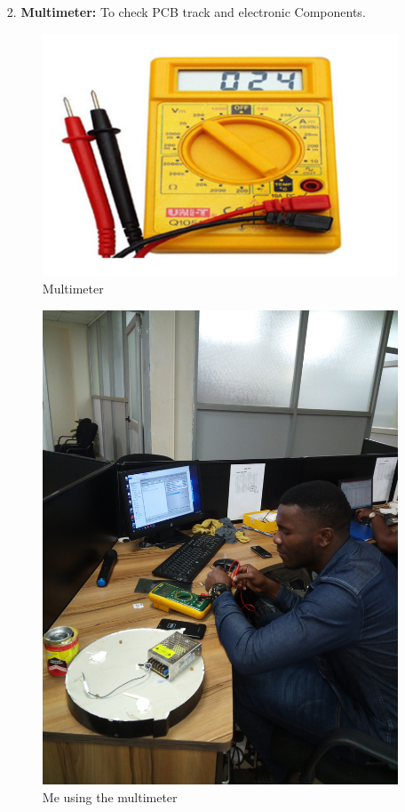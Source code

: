\begin{itemize}
\item[2.] \textbf{Multimeter:} To check PCB track and electronic Components.
\begin{figure}[h!]
\begin{raggedright}
	\includegraphics[scale=0.5]{img/multimeter.PNG}
	\caption{Multimeter}
	\label{fig:symbols}
\end{raggedright}
\end{figure}
\begin{figure}[h!]
\begin{center}
	\includegraphics[scale= 0.1]{img/meter.jpg}
	\caption{Me using the multimeter }
	\label{fig:symbols}
\end{center}
\end{figure}



\end{itemize}
